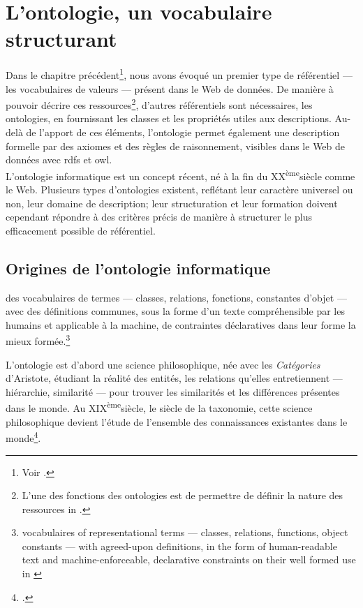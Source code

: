 \section{\label{II-B-1}L'ontologie, un vocabulaire structurant}

Dans le chapitre précédent\footnote{Voir .}, nous avons évoqué un premier type de référentiel --- les vocabulaires de valeurs --- présent dans le Web de données. De manière à pouvoir décrire ces ressources\footnote{\og L'une des fonctions des ontologies est de permettre de définir la nature des ressources\fg{} in \cite[§49]{bermes_convergence_2013}.}, d'autres référentiels sont nécessaires, les ontologies, en fournissant les classes et les propriétés utiles aux descriptions. Au-delà de l'apport de ces éléments, l'ontologie permet également une description formelle par des axiomes et des règles de raisonnement, visibles dans le Web de données avec \ac{rdfs} et \ac{owl}.\\

L'ontologie informatique est un concept récent, né à la fin du \textsc{XX}\textsuperscript{ème}siècle comme le Web. Plusieurs types d'ontologies existent, reflétant leur caractère universel ou non, leur domaine de description; leur structuration et leur formation doivent cependant répondre à des critères précis de manière à structurer le plus efficacement possible de référentiel.

\subsection{\label{II-B-1-a}Origines de l'ontologie informatique}

\begin{citationLongue}
	 des vocabulaires de termes --- classes, relations, fonctions, constantes d'objet --- avec des définitions communes, sous la forme d'un texte compréhensible par les humains et applicable à la machine, de contraintes déclaratives dans leur forme la mieux formée.\footnote{\og vocabulaires of representational terms --- classes, relations, functions, object constants ---  with agreed-upon definitions, in the form of human-readable text and machine-enforceable, declarative constraints on their well formed use\fg{} in \cite[p.2]{gruber_role_1991}}
\end{citationLongue}

L'ontologie est d'abord une science philosophique, née avec les \textit{Catégories} d'Aristote, étudiant la réalité des entités, les relations qu'elles entretiennent --- hiérarchie, similarité --- pour trouver les similarités et les différences présentes dans le monde. Au \textsc{XIX}\textsuperscript{ème}siècle, le siècle de la taxonomie, cette science philosophique devient l'étude de l'ensemble des connaissances existantes dans le monde\footcite{welty_supporting_2011}.\\

